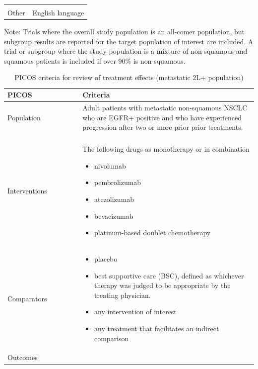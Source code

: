 \documentclass[11pt,final,fleqn]{article}\usepackage[]{graphicx}\usepackage[]{color}
\theoremstyle{plain}
\begin{document}
\begin{appendices}
\begin{table}[!ht]
\begin{center}
\begin{threeparttable}
\begin{tabular}{p{0.3\linewidth}p{0.7\linewidth}}
\begin{itemize}
\end{itemize} \\
Other & English language\\
\hline
\end{tabular}
\scriptsize Note: Trials where the overall study population is an all-comer population, but subgroup results are reported for the target population of interest are included. A trial or subgroup where the study population is a mixture of non-squamous and squamous patients is included if over 90\% is non-squamous.  
\end{threeparttable}
\end{center}
\end{table}

\begin{table}[!ht]
\begin{center}
\begin{threeparttable}
\caption{PICOS criteria for review of treatment effects (metastatic 2L+ population)} \label{tbl:picos-tx-effects-2LP}
\begin{tabular}{p{0.3\linewidth}p{0.7\linewidth}}
\hline
\multicolumn{1}{l}{PICOS} &  \multicolumn{1}{l}{Criteria}\\
\hline
Population & Adult patients with metastatic non-squamous NSCLC who are EGFR+ positive and
who have experienced progression after two or more prior prior treatments.\\
&\\
Interventions & The following drugs as monotherapy or in combination 
\begin{itemize}
\item nivolumab
\item pembrolizumab
\item atezolizumab
\item bevacizumab
\item platinum-based doublet chemotherapy
\end{itemize} \\
Comparators & 
\begin{itemize}
\item placebo
\item best supportive care (BSC), defined as whichever therapy was judged to be appropriate by the treating physician.
\item any intervention of interest
\item any treatment that facilitates an indirect comparison
\end{itemize} \\
Outcomes & 

\end{tabular}
\end{threeparttable}
\end{center}
\end{table}
\end{appendices}
\end{document}
